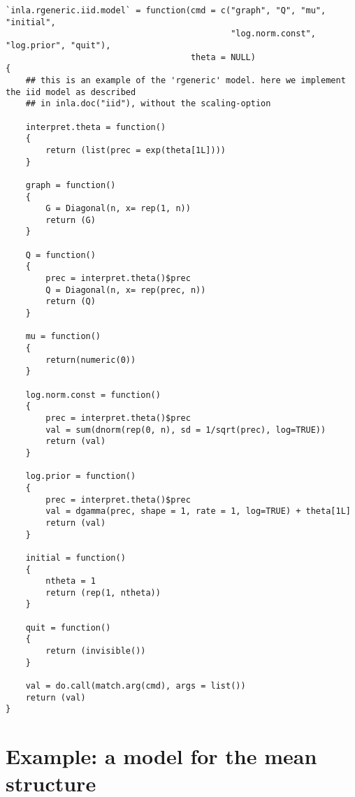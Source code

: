 \documentclass[a4paper,11pt]{article}
\begin{document}
{\small
\begin{verbatim}
`inla.rgeneric.iid.model` = function(cmd = c("graph", "Q", "mu", "initial",
                                             "log.norm.const", "log.prior", "quit"),
                                     theta = NULL)
{
    ## this is an example of the 'rgeneric' model. here we implement the iid model as described
    ## in inla.doc("iid"), without the scaling-option

    interpret.theta = function()
    {
        return (list(prec = exp(theta[1L])))
    }

    graph = function()
    {
        G = Diagonal(n, x= rep(1, n))
        return (G)
    }

    Q = function()
    {
        prec = interpret.theta()$prec
        Q = Diagonal(n, x= rep(prec, n))
        return (Q)
    }

    mu = function()
    {
        return(numeric(0))
    }

    log.norm.const = function()
    {
        prec = interpret.theta()$prec
        val = sum(dnorm(rep(0, n), sd = 1/sqrt(prec), log=TRUE))
        return (val)
    }

    log.prior = function()
    {
        prec = interpret.theta()$prec
        val = dgamma(prec, shape = 1, rate = 1, log=TRUE) + theta[1L]
        return (val)
    }

    initial = function()
    {
        ntheta = 1
        return (rep(1, ntheta))
    }

    quit = function()
    {
        return (invisible())
    }

    val = do.call(match.arg(cmd), args = list())
    return (val)
}
\end{verbatim}
}

\clearpage
\section*{Example: a model for the mean structure}

{\small

}
\end{document}
